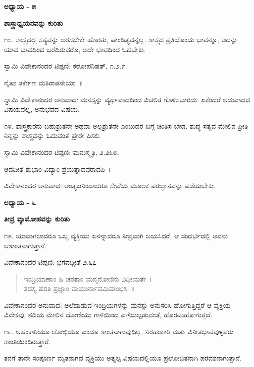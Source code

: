 \begin{center}
\textbf{ಅಧ್ಯಾಯ - ೫}
\end{center}

\begin{center}
\textbf{ಶಾಸ್ತ್ರಾಧ್ಯಯನವನ್ನು ಕುರಿತು}
\end{center}

೧೩. ಶಾಸ್ತ್ರದಲ್ಲಿ ಸತ್ಯವನ್ನು ಅರಸಬೇಕೇ ಹೊರತು, ಪಾಂಡಿತ್ಯವನ್ನಲ್ಲ. ಶಾಸ್ತ್ರದ ಪ್ರತಿಯೊಂದು ಭಾವನ್ನೂ, ಅದನ್ನು ಯಾವ ಭಾವದಿಂದ ಬರೆದಿರುವರೊ, ಅದೇ ಭಾವದಿಂದ ಓದಬೇಕು. 

ಸ್ವಾಮಿ ವಿವೇಕಾನಂದರ ಟಿಪ್ಪಣಿ: ಕಠೋಪನಿಷತ್, ೧.೨.೯.

ನೈಷಾ ತರ್ಕೇಣ ಮತಿರಾಪನೇಯಾ~॥

ಸ್ವಾಮಿ ವಿವೇಕಾನಂದರ ಅನುವಾದ: ಮನಸ್ಸನ್ನು ವ್ಯರ್ಥವಾದದಿಂದ ವಿಚಲಿತ ಗೊಳಿಸಬಾರದು. ಏಕೆಂದರೆ ಅದುವಾದದ ವಿಷಯವಲ್ಲ, ಅನುಭವದ ವಿಷಯ.

೧೪. ಶಾಸ್ತ್ರಕಾರನು ಬಹುಶ್ರುತನೇ ಅಥವಾ ಅಲ್ಪಶ್ರುತನೇ ಎಂಬುದರ ಬಗ್ಗೆ ಚಿಂತಿಸ ಬೇಡ. ಶುದ್ಧ ಸತ್ಯದ ಮೇಲಿನ ಪ್ರೀತಿ ನಿನ್ನನ್ನು ಶಾಸ್ತ್ರವನ್ನು ಓದುವಂತೆ ಪ್ರೇರೇ ಪಿಸಲಿ. 

ಸ್ವಾಮಿ ವಿವೇಕಾನಂದರ ಟಿಪ್ಪಣಿ: ಮನುಸ್ಮೃತಿ, ೨.೨೩೮.

ಆದದೀತ ಶುಭಾಂ ವಿದ್ಯಾಂ ಪ್ರಯತ್ನಾದವರಾದಪಿ~।

ವಿವೇಕಾನಂದರ ಅನುವಾದ: ಅಂತ್ಯಜನಿಂದಾದರೂ ಸೇವೆಯ ಮೂಲಕ ಪರಜ್ಞಾನವನ್ನು ಪಡೆಯಬೇಕು.

\begin{center}
\textbf{ಅಧ್ಯಾಯ - ೬}
\end{center}

\begin{center}
\textbf{ತೀವ್ರ ವ್ಯಾಮೋಹವನ್ನು ಕುರಿತು}
\end{center}

೧೫. ಯಾವಾಗಲಾದರೂ ಒಬ್ಬ ವ್ಯಕ್ತಿಯು ಏನನ್ನಾದರೂ ತೀವ್ರವಾಗಿ ಬಯಸಿದರೆ, ಆ ಸಂದರ್ಭದಲ್ಲಿ ಅವನು ಅಶಾಂತನಾಗುತ್ತಾನೆ. 

ವಿವೇಕಾನಂದರ ಟಿಪ್ಪಣಿ: ಭಗವದ್ಗೀತೆ ೨.೬೭

\begin{verse}
ಇಂದ್ರಿಯಾಣಾಂ ಹಿ ಚರತಾಂ ಯನ್ಮನೋಣಿನು ವಿಧೀಯತೇ~।\\ತದಸ್ಯ ಹರತಿ ಪ್ರಜ್ಞಾಂ ವಾಯುರ್ನಾವಮಿವಾಂಭಸಿ~॥
\end{verse}

ವಿವೇಕಾನಂದರ ಅನುವಾದ: ಅಲೆದಾಡುವ ಇಂದ್ರಿಯಗಳನ್ನು ಮನಸ್ಸು ಅನುಸರಿಸಿ ಹೋಗುತ್ತಿದ್ದರೆ ಆ ವ್ಯಕ್ತಿಯ ವಿವೇಕವು, ನದಿಯ ಮೇಲಿನ ದೋಣಿಯು ಗಾಳಿಯಿಂದ ಎಳೆಯಲ್ಪಡುವಂತೆ, ಹೊರಟುಹೋಗುತ್ತದೆ.

೧೬. ಅಹಂಕಾರಿಯೂ ಲೋಭಿಯೂ ಎಂದೂ ಶಾಂತನಾಗುವುದಿಲ್ಲ. ನಿರಹಂಕಾರಿ ಮತ್ತು ವಿನೀತಭಾವವುಳ್ಳವರು ಶಾಂತಿಯಿಂದಿರುತ್ತಾರೆ.

ತನಗೆ ತಾನೇ ಸಂಪೂರ್ಣ ಮೃತನಾಗದ ವ್ಯಕ್ತಿಯು ಅತ್ಯಲ್ಪ ವಿಷಯದಲ್ಲಿಯೂ ಪ್ರಲೋಭಿತನಾಗಿ ಪರವಶನಾಗುತ್ತಾನೆ. 

